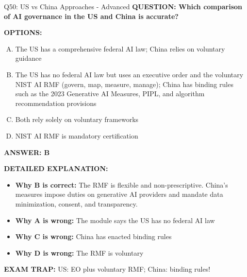 \documentclass[8pt]{beamer}
\begin{document}
\begin{frame}[shrink=6]{Q50: US vs China Approaches - Advanced}
\fontsize{6.5}{7.5}\selectfont
\textbf{QUESTION: Which comparison of AI governance in the US and China is accurate?}

\vspace{0.1cm}
\textbf{OPTIONS:}
\begin{enumerate}[A.]
\item The US has a comprehensive federal AI law; China relies on voluntary guidance
\item The US has no federal AI law but uses an executive order and the voluntary NIST AI RMF (govern, map, measure, manage); China has binding rules such as the 2023 Generative AI Measures, PIPL, and algorithm recommendation provisions
\item Both rely solely on voluntary frameworks
\item NIST AI RMF is mandatory certification
\end{enumerate}

\vspace{0.1cm}
\textcolor{myblue}{\textbf{ANSWER: B}}

\vspace{0.1cm}
\textbf{DETAILED EXPLANATION:}
\begin{itemize}
\item \textbf{Why B is correct:} The RMF is flexible and non-prescriptive. China's measures impose duties on generative AI providers and mandate data minimization, consent, and transparency.
\item \textbf{Why A is wrong:} The module says the US has no federal AI law
\item \textbf{Why C is wrong:} China has enacted binding rules
\item \textbf{Why D is wrong:} The RMF is voluntary
\end{itemize}

\textcolor{myred}{\textbf{EXAM TRAP:}} US: EO plus voluntary RMF; China: binding rules!
\end{frame}
\end{document}
